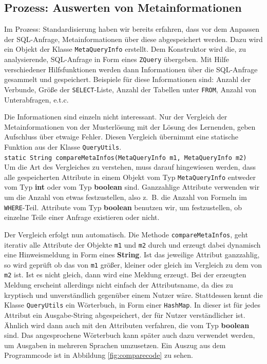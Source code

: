 \subsection*{Prozess: Auswerten von Metainformationen} 

Im Prozess: Standardisierung haben wir bereits erfahren, dass vor dem Anpassen der SQL-Anfrage, Metainformationen über diese abgespeichert werden. Dazu wird ein Objekt der Klasse \verb|MetaQueryInfo| erstellt. Dem Konstruktor wird die, zu analysierende, SQL-Anfrage in Form eines \verb|ZQuery| übergeben. Mit Hilfe verschiedener Hilfsfunktionen werden dann Informationen über die SQL-Anfrage gesammelt und gespeichert. Beispiele für diese Informationen sind: Anzahl der Verbunde, Größe der \verb|SELECT|-Liste, Anzahl der Tabellen unter \verb|FROM|, Anzahl von Unterabfragen, e.t.c. 

Die Informationen sind einzeln nicht interessant. Nur der Vergleich der Metainformationen von der Musterlösung mit der Lösung des Lernenden, geben Aufschluss über etwaige Fehler. Diesen Vergleich übernimmt eine statische Funktion aus der Klasse \verb|QueryUtils|.\\
\verb|static String compareMetaInfos(MetaQueryInfo m1, MetaQueryInfo m2)|\\
Um die Art des Vergleiches zu verstehen, muss darauf hingewiesen werden, dass alle gespeicherten Attribute in einem Objekt vom Typ \verb|MetaQueryInfo| entweder vom Typ \textbf{int} oder vom Typ \textbf{boolean} sind. Ganzzahlige Attribute verwenden wir um die Anzahl von etwas festzustellen, also \mbox{z. B.} die Anzahl von Formeln im \verb|WHERE|-Teil. Attribute vom Typ \textbf{boolean} benutzen wir, um festzustellen, ob einzelne Teile einer Anfrage existieren oder nicht.

Der Vergleich erfolgt nun automatisch. Die Methode \verb|compareMetaInfos|, geht iterativ alle Attribute der Objekte \verb|m1| und \verb|m2| durch und erzeugt dabei dynamisch eine Hinweismeldung in Form eines \textbf{String}. Ist das jeweilige Attribut ganzzahlig, so wird geprüft ob das von \verb|m1| größer, kleiner oder gleich im Vergleich zu dem von \verb|m2| ist. Ist es nicht gleich, dann wird eine Meldung erzeugt. Bei der erzeugten Meldung erscheint allerdings nicht einfach der Attributsname, da dies zu kryptisch und unverständlich gegenüber einem Nutzer wäre. Stattdessen kennt die Klasse \verb|QueryUtils| ein Wörterbuch, in Form einer \verb|HashMap|. In dieser ist für jedes Attribut ein Ausgabe-String abgespeichert, der für Nutzer verständlicher ist. Ähnlich wird dann auch mit den Attributen verfahren, die vom Typ \textbf{boolean} sind. Das angesprochene Wörterbuch kann später auch dazu verwendet werden, um Ausgaben in mehreren Sprachen umzusetzen.
Ein Auszug aus dem Programmcode ist in Abbildung \ref{fig:comparecode} zu sehen.

